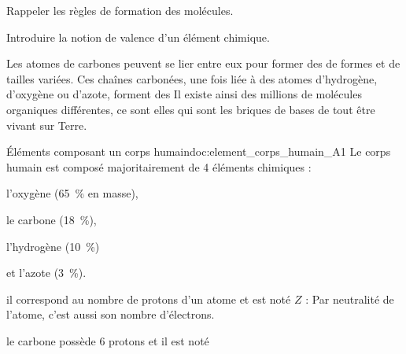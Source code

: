 \tetePremStssOrga

\vspace*{-30pt}


\begin{objectifs}
  \item Rappeler les règles de formation des molécules.
  \item Introduire la notion de valence d'un élément chimique.
\end{objectifs}

\begin{contexte}
  Les atomes de carbones peuvent se lier entre eux pour former des  de formes et de tailles variées.
  Ces chaînes carbonées, une fois liée à des atomes d'hydrogène, d'oxygène ou d'azote, forment des 
  Il existe ainsi des millions de molécules organiques différentes, ce sont elles qui sont les briques de bases de tout être vivant sur Terre.

\end{contexte}


\begin{doc}{Éléments composant un corps humain}{doc:element_corps_humain_A1}
  Le corps humain est composé majoritairement de 4 éléments chimiques :
  \vspace*{-4pt}
  \begin{listePoints}[2]
    \item l'oxygène    (\qty{65}{\percent} en masse),
    \item le carbone   (\qty{18}{\percent}),
    \item l'hydrogène  (\qty{10}{\percent})
    \item et l'azote   (\qty{3}{\percent}).
  \end{listePoints}
  
  \begin{importants}
     il correspond au nombre de protons d'un atome et est noté $Z$ : 
    Par neutralité de l'atome, c'est aussi son nombre d'électrons.
  \end{importants}
   \exemple le carbone possède 6 protons et il est noté 
\end{doc}


